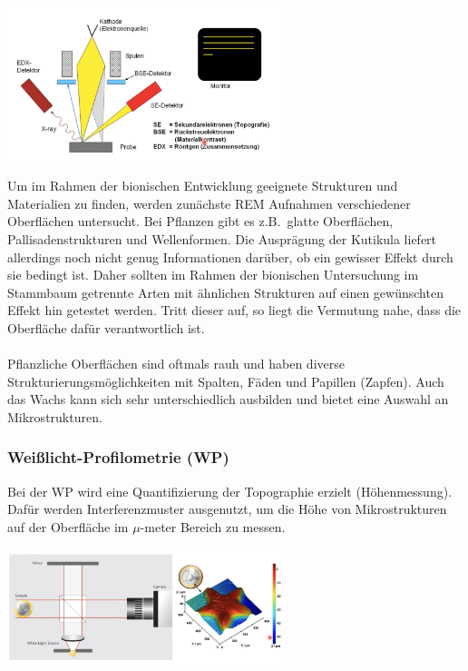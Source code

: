 \begin{center}
	\includegraphics[width=8cm]{lec2/figures/rem.png}	
\end{center}
Um im Rahmen der bionischen Entwicklung geeignete Strukturen und Materialien zu finden, werden zunächste REM Aufnahmen verschiedener Oberflächen untersucht. Bei Pflanzen gibt es z.B.\ glatte Oberflächen, Pallisadenstrukturen und Wellenformen. Die Ausprägung der Kutikula liefert allerdings noch nicht genug Informationen darüber, ob ein gewisser Effekt durch sie bedingt ist. Daher sollten im Rahmen der bionischen Untersuchung im Stammbaum getrennte Arten mit ähnlichen Strukturen auf einen gewünschten Effekt hin getestet werden. Tritt dieser auf, so liegt die Vermutung nahe, dass die Oberfläche dafür verantwortlich ist.
\\\\
Pflanzliche Oberflächen sind oftmals rauh und haben diverse Strukturierungsmöglichkeiten mit Spalten, Fäden und Papillen (Zapfen). Auch das Wachs kann sich sehr unterschiedlich ausbilden und bietet eine Auswahl an Mikrostrukturen.

\subsubsection{Weißlicht-Profilometrie (WP)}

Bei der WP wird eine Quantifizierung der Topographie erzielt (Höhenmessung). Dafür werden Interferenzmuster ausgenutzt, um die Höhe von Mikrostrukturen auf der Oberfläche im $\mu$-meter Bereich zu messen.

\begin{center}
	\includegraphics[width=8cm]{lec2/figures/wp.png}	
\end{center}

